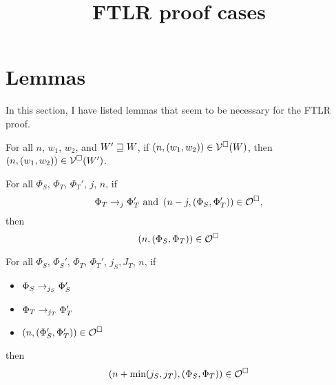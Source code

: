 \documentclass[a4paper]{article}
\title{FTLR proof cases}
\begin{document}
\maketitle
\section{Lemmas}
In this section, I have listed lemmas that seem to be necessary for the FTLR proof.
\begin{lemma}
  For all $n$, $w_1$, $w_2$, and $W' \future W$, if $\npair{(w_1,w_2)} \in \lrv(W)$, then $\npair{(w_1,w_2)} \in \lrv(W')$.
\end{lemma}

\begin{lemma}
  For all $\Phi_S$, $\Phi_T$, $\Phi_T'$, $j$, $n$, if
\[
  \Phi_T \nstep[j] \Phi_T' \text{ and } \npair[n-j]{(\Phi_S,\Phi_T')} \in \lro,
\]
then
\[
  \npair{(\Phi_S,\Phi_T)} \in \lro
\]
\end{lemma}

\begin{lemma}
  For all $\Phi_S$, $\Phi_S'$, $\Phi_T$, $\Phi_T'$, $j_S,J_T$, $n$, if
  \begin{itemize}
  \item $\Phi_S \nstep[j_S] \Phi_S'$
  \item $\Phi_T \nstep[j_T] \Phi_T'$
  \item $\npair{(\Phi_S',\Phi_T')} \in \lro$
\end{itemize}
then
\[
  \npair[n+\min(j_S,j_T)]{(\Phi_S,\Phi_T)} \in \lro
\]
\end{lemma}
\end{document}
